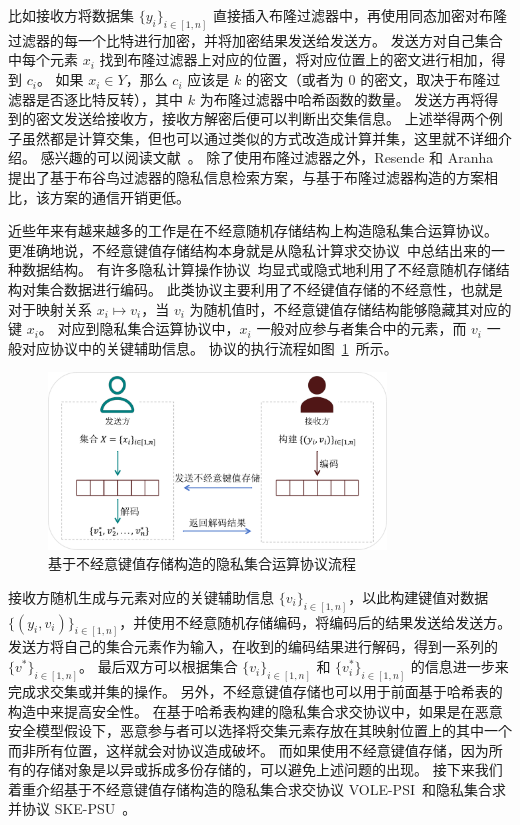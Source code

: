比如接收方将数据集 $\{y_i\}_{i\in [1,n]}$ 直接插入布隆过滤器中，再使用同态加密对布隆过滤器的每一个比特进行加密，并将加密结果发送给发送方。
发送方对自己集合中每个元素 $x_i$ 找到布隆过滤器上对应的位置，将对应位置上的密文进行相加，得到 $c_i$。
如果 $x_i\in Y$，那么 $c_i$ 应该是 $k$ 的密文（或者为 $0$ 的密文，取决于布隆过滤器是否逐比特反转），其中 $k$ 为布隆过滤器中哈希函数的数量。
发送方再将得到的密文发送给接收方，接收方解密后便可以判断出交集信息。
上述举得两个例子虽然都是计算交集，但也可以通过类似的方式改造成计算并集，这里就不详细介绍。
感兴趣的可以阅读文献~\cite{davidson2017efficient,chen2024private}。
除了使用布隆过滤器之外，Resende 和 Aranha~\cite{resende2018faster} 提出了基于布谷鸟过滤器的隐私信息检索方案，与基于布隆过滤器构造的方案相比，该方案的通信开销更低。

近些年来有越来越多的工作是在不经意随机存储结构上构造隐私集合运算协议。
更准确地说，不经意键值存储结构本身就是从隐私计算求交协议~\cite{garimella2021oblivious}中总结出来的一种数据结构。
有许多隐私计算操作协议~\cite{kolesnikov2019scalable,garimella2021private,rindal2021volepsi,zhang2023linear}均显式或隐式地利用了不经意随机存储结构对集合数据进行编码。
此类协议主要利用了不经键值存储的不经意性，也就是对于映射关系 $x_i \mapsto v_i$，当 $v_i$ 为随机值时，不经意键值存储结构能够隐藏其对应的键 $x_i$。
对应到隐私集合运算协议中，$x_i$ 一般对应参与者集合中的元素，而 $v_i$ 一般对应协议中的关键辅助信息。
协议的执行流程如图~\ref{fig:pso_okvs}~所示。
\begin{figure}[ht]
  \centering
  \includegraphics[width=0.8\textwidth]{figures/pso_okvs.pdf}
  \caption{基于不经意键值存储构造的隐私集合运算协议流程}
  \label{fig:pso_okvs}
\end{figure}
接收方随机生成与元素对应的关键辅助信息 $\{v_i\}_{i\in [1,n]}$，以此构建键值对数据 $\{(y_i, v_i)\}_{i\in [1,n]}$，并使用不经意随机存储编码，将编码后的结果发送给发送方。
发送方将自己的集合元素作为输入，在收到的编码结果进行解码，得到一系列的 $\{v^*\}_{i\in [1,n]}$。
最后双方可以根据集合 $\{v_i\}_{i\in [1,n]}$ 和 $\{v_i^*\}_{i\in [1,n]}$ 的信息进一步来完成求交集或并集的操作。
另外，不经意键值存储也可以用于前面基于哈希表的构造中来提高安全性。
在基于哈希表构建的隐私集合求交协议中，如果是在恶意安全模型假设下，恶意参与者可以选择将交集元素存放在其映射位置上的其中一个而非所有位置，这样就会对协议造成破坏。
而如果使用不经意键值存储，因为所有的存储对象是以异或拆成多份存储的，可以避免上述问题的出现。
接下来我们着重介绍基于不经意键值存储构造的隐私集合求交协议 VOLE-PSI~\cite{rindal2021volepsi}和隐私集合求并协议 SKE-PSU~\cite{zhang2023linear}。

